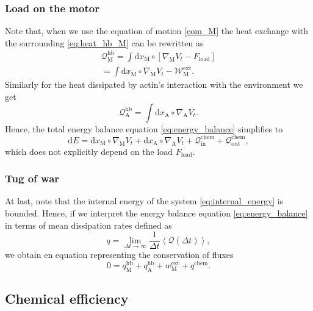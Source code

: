 \documentclass[aps,pre,twocolumn,showpacs,showkeys]{revtex4-1}
\newcommand{\rmd}{{\mathrm d}}
\begin{document}
\subsubsection{Load on the motor}
Note that, when we use the equation of motion \eqref{eom_M} the heat exchange with the surrounding \eqref{eq:heat_hb_M} can be rewritten as 
\begin{multline*}
{\mathcal Q}_\text{M}^\text{hb} 
= \int \rmd x_\text{M} \circ \left[ \nabla_\text{M} V_t - F_\text{load} \right] 
\\
= \int \rmd x_\text{M} \circ \nabla_\text{M} V_t - {\mathcal W}_\text{M}^\text{ext} .
\end{multline*}
Similarly for the heat dissipated by actin's interaction with the environment we get 
\[
{\mathcal Q}_\text{A}^\text{hb} 
= \int \rmd x_\text{A} \circ \nabla_\text{A} V_t . 
\]
Hence, the total energy balance equation \eqref{eq:energy_balance} simplifies to 
\[
\rmd E 
= \rmd x_\text{M} \circ \nabla_\text{M} V_t  
+ \rmd x_\text{A} \circ \nabla_\text{A} V_t  
+ {\mathcal Q}_\text{in}^\text{chem}
+ {\mathcal Q}_\text{out}^\text{chem} , 
\]
which does not explicitly depend on the load $F_\text{load}$. 

\subsubsection{Tug of war} 

At last, note that the internal energy of the system \eqref{eq:internal_energy} is bounded.
Hence, if we interpret the energy balance equation \eqref{eq:energy_balance} in terms of mean dissipation rates defined as 
\[
q = \lim_{\Delta t \to \infty} \frac{1}{\Delta t} \left\langle {\mathcal Q}(\Delta t) \right\rangle ,
\]
we obtain en equation representing the conservation of fluxes 
\[
0 = q_\text{M}^\text{hb} + q_\text{A}^\text{hb} + w^\text{ext}_\text{M} + q^\text{chem} .
\]

\subsection{Chemical efficiency} 
\end{document}
